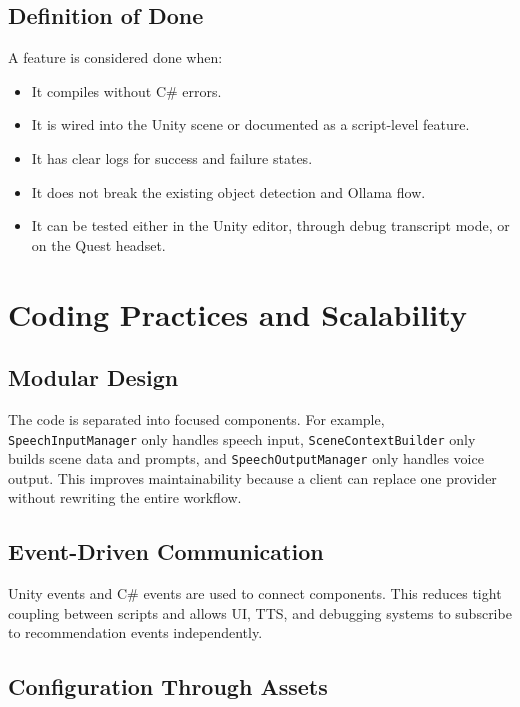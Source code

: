 \documentclass[12pt,a4paper]{article}
\begin{document}
\subsection{Definition of Done}

A feature is considered done when:

\begin{itemize}
    \item It compiles without C\# errors.
    \item It is wired into the Unity scene or documented as a script-level feature.
    \item It has clear logs for success and failure states.
    \item It does not break the existing object detection and Ollama flow.
    \item It can be tested either in the Unity editor, through debug transcript mode, or on the Quest headset.
\end{itemize}

\section{Coding Practices and Scalability}

\subsection{Modular Design}

The code is separated into focused components. For example, \texttt{SpeechInputManager} only handles speech input, \texttt{SceneContextBuilder} only builds scene data and prompts, and \texttt{SpeechOutputManager} only handles voice output. This improves maintainability because a client can replace one provider without rewriting the entire workflow.

\subsection{Event-Driven Communication}

Unity events and C\# events are used to connect components. This reduces tight coupling between scripts and allows UI, TTS, and debugging systems to subscribe to recommendation events independently.

\subsection{Configuration Through Assets}
\end{document}
